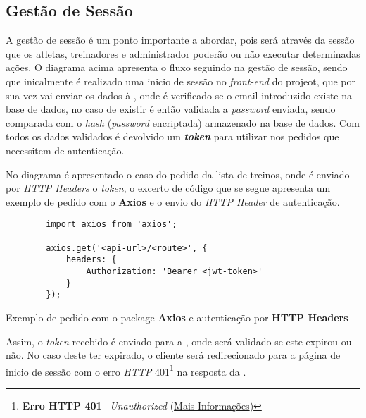 \subsection{Gestão de Sessão}
\label{sessionSequenceDiagram}


A gestão de sessão é um ponto importante a abordar, pois será através da sessão que os atletas, treinadores e administrador poderão ou não executar determinadas ações. O diagrama acima apresenta o fluxo seguindo  na gestão de sessão, sendo que inicalmente é realizado uma inicio de sessão no \textit{front-end} do projeot, que por sua vez vai enviar os dados à \textbf{}, onde é verificado se o email introduzido existe na base de dados, no caso de existir é então validada a \textit{password} enviada, sendo comparada com o \textit{hash} (\textit{password} encriptada) armazenado na base de dados. Com todos os dados validados é devolvido um \textbf{ \textit{token}} para utilizar nos pedidos que necessitem de autenticação.

No diagrama é apresentado o caso do pedido da lista de treinos, onde é enviado por \textit{HTTP Headers} o \textit{token}, o excerto de código que se segue apresenta um exemplo de pedido com o \textit{} \textbf{\href{https://github.com/axios/axios}{Axios}} e o envio do \textit{HTTP Header} de autenticação.

\begin{longlisting}
	\begin{verbatim}
		import axios from 'axios';

		axios.get('<api-url>/<route>', {
			headers: {
				Authorization: 'Bearer <jwt-token>'
			}
		});
	\end{verbatim}

	\caption{Exemplo de pedido com o package \textbf{Axios} e autenticação por \textbf{HTTP Headers}}
\end{longlisting}

Assim, o \textit{token} \textbf{} recebido é enviado para a \textbf{}, onde será validado se este expirou ou não. No caso deste ter expirado, o cliente será redirecionado para a página de inicio de sessão com o erro \textit{HTTP} 401\footnote{\textbf{Erro HTTP 401 \textemdash} ~\textit{Unauthorized} (\href{https://developer.mozilla.org/pt-BR/docs/Web/HTTP/Status/401}{Mais Informações})} na resposta da \textbf{}.